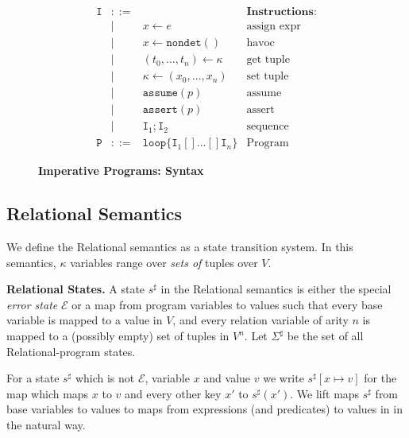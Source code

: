 \documentclass[nocopyrightspace]{sigplanconf}
\newcommand{\figbegin}{}
\newcommand{\figend}{}
\def\mypara#1{\smallskip\noindent\textbf{#1}}
\newcommand{\UPD}[3]{{#1}[{#2} \mapsto {#3}]}
\newcommand{\ASSERT}[2]{\{{#1}\}\ {#2}}
\newcommand{\ERROR}{\mathit{Error}}
\newcommand{\kvar}{\kappa}
\def\NONDET{\mathtt{nondet}}
\newcommand{\istate}{s}
\newcommand{\istates}{\Sigma}
\newcommand{\rstate}{\istate^{\sharp}}
\newcommand{\rstates}{\istates^{\sharp}}
\newcommand{\ASSIGN}[2]{{#1} \leftarrow {#2}}
\newcommand{\TASSIGN}[2]{{#1} \leftarrow {#2}}
\newcommand{\HAVOC}[1]{\ASSIGN{#1}{\NONDET()}}
\def\ASSUME{{{\mathtt{assume}}}}
\def\ASSERT{{{\mathtt{assert}}}}
\newcommand{\GET}[2]{\TASSIGN{#2}{#1}}
\newcommand{\SET}[2]{\TASSIGN{#1}{#2}}
\def\LOOP{{{\mathtt{loop}}}}
\def\vals{V}
\def\val{v}
\def\CHOOSE{{[\!]}}
\def\instr{\mathtt{I}}
\def\prgm{\mathtt{P}}
\def\rkvar{{\kvar}}
\def\RELSEM{{Relational}\xspace}
\def\REFREL{relation\xspace}
\def\ERROR{{\mathcal{E}}}
\begin{document}
\begin{figure}[t]
\begin{small}
\figbegin
\begin{displaymath}
\begin{array}{llll}
\instr 	& ::=  &  					& \textbf{Instructions:}\\
	& \mid & \ASSIGN{x}{e}				& \mbox{assign expr}\\
	& \mid & \HAVOC{x} 				& \mbox{havoc}\\
	& \mid & \GET{\rkvar}{(t_0,\ldots,t_n)}		& \mbox{get tuple}\\
	& \mid & \SET{\rkvar}{(x_0,\ldots,x_n)}		& \mbox{set tuple}\\ 
	& \mid & \ASSUME(p) 				& \mbox{assume} \\
	& \mid & \ASSERT(p) 				& \mbox{assert} \\
	& \mid & \instr_1; \instr_2			& \mbox{sequence} \\[4pt]
\prgm   & ::=  & \LOOP \{\instr_1 \CHOOSE \ldots \CHOOSE \instr_n \} & \mbox{Program}
\end{array}
\end{displaymath}
\figend
\end{small}
\caption{\textbf{Imperative Programs: Syntax}}
\label{fig:impsyntax}
\end{figure}


\subsection{\RELSEM Semantics}
\label{sec:relsemantics}

We define the \RELSEM semantics as a state transition system.
In this semantics, $\rkvar$ variables  range over 
\emph{sets of} tuples over $\vals$.

\mypara{\RELSEM States.}
A state $\rstate$ in the \RELSEM semantics
is either the special \emph{error state} $\ERROR$ 
or a map from program variables to values such that
every base variable is mapped to a value in $\vals$, 
and every \REFREL variable of arity $n$ is mapped 
to a (possibly empty) set of tuples in $\vals^n$.
Let $\rstates$ be the set of all \RELSEM-program states.

For a state $\rstate$ which is not $\ERROR$, variable $x$ and value $\val$ 
we write $\UPD{\rstate}{x}{\val}$ for the map which maps $x$
to $\val$ and every other key $x'$ to $\rstate(x')$.
We lift maps $\rstate$ from base variables to values to maps 
from expressions (and predicates) to values in in 
the natural way.
\end{document}
